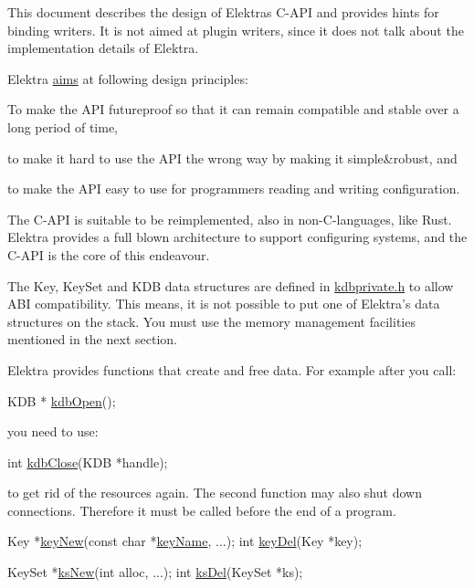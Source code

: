 This document describes the design of Elektra\textquotesingle{}s C-\/\+A\+PI and provides hints for binding writers. It is not aimed at plugin writers, since it does not talk about the implementation details of Elektra.

Elektra \hyperlink{doc_GOALS_md}{aims} at following design principles\+:


\begin{DoxyEnumerate}
\item To make the A\+PI futureproof so that it can remain compatible and stable over a long period of time,
\item to make it hard to use the A\+PI the wrong way by making it simple\&robust, and
\item to make the A\+PI easy to use for programmers reading and writing configuration.
\end{DoxyEnumerate}

The C-\/\+A\+PI is suitable to be reimplemented, also in non-\/\+C-\/languages, like Rust. Elektra provides a full blown architecture to support configuring systems, and the C-\/\+A\+PI is the core of this endeavour.

The {\ttfamily Key}, {\ttfamily Key\+Set} and {\ttfamily K\+DB} data structures are defined in {\ttfamily \hyperlink{kdbprivate_8h}{kdbprivate.\+h}} to allow A\+BI compatibility. This means, it is not possible to put one of Elektra’s data structures on the stack. You must use the memory management facilities mentioned in the next section.

Elektra provides functions that create and free data. For example after you call\+:


\begin{DoxyCode}
KDB * \hyperlink{group__kdb_ga6808defe5870f328dd17910aacbdc6ca}{kdbOpen}();
\end{DoxyCode}


you need to use\+:


\begin{DoxyCode}
\textcolor{keywordtype}{int} \hyperlink{group__kdb_gadb54dc9fda17ee07deb9444df745c96f}{kdbClose}(KDB *handle);
\end{DoxyCode}


to get rid of the resources again. The second function may also shut down connections. Therefore it must be called before the end of a program.


\begin{DoxyCode}
Key *\hyperlink{group__key_gad23c65b44bf48d773759e1f9a4d43b89}{keyNew}(\textcolor{keyword}{const} \textcolor{keywordtype}{char} *\hyperlink{group__keyname_ga8e805c726a60da921d3736cda7813513}{keyName}, ...);
\textcolor{keywordtype}{int} \hyperlink{group__key_ga3df95bbc2494e3e6703ece5639be5bb1}{keyDel}(Key *key);

KeySet *\hyperlink{group__keyset_ga671e1aaee3ae9dc13b4834a4ddbd2c3c}{ksNew}(\textcolor{keywordtype}{int} alloc, ...);
\textcolor{keywordtype}{int} \hyperlink{group__keyset_ga27e5c16473b02a422238c8d970db7ac8}{ksDel}(KeySet *ks);
\end{DoxyCode}


